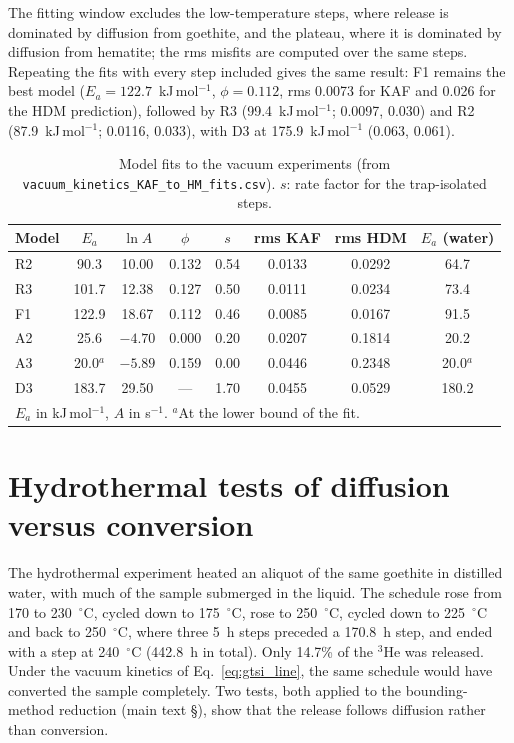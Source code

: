 The fitting window excludes the low-temperature steps, where release is dominated by diffusion from
goethite, and the plateau, where it is dominated by diffusion from hematite; the rms misfits are
computed over the same steps. Repeating the fits with every step included gives the same result:
F1 remains the best model ($E_a = 122.7$~kJ\,mol$^{-1}$, $\phi = 0.112$, rms 0.0073 for KAF and 0.026
for the HDM prediction), followed by R3 (99.4~kJ\,mol$^{-1}$; 0.0097, 0.030) and R2 (87.9~kJ\,mol$^{-1}$;
0.0116, 0.033), with D3 at 175.9~kJ\,mol$^{-1}$ (0.063, 0.061).

\begin{table}[htbp]
  \centering
  \caption{Model fits to the vacuum experiments (from \texttt{vacuum\_kinetics\_KAF\_to\_HM\_fits.csv}). $s$: rate factor for the trap-isolated steps.}
  \label{tab:gtsi_mech_fits}
  \begin{tabular}{lccccccc}
    \hline
    Model & $E_a$ & $\ln A$ & $\phi$ & $s$ & rms KAF & rms HDM & $E_a$ (water) \\
    \hline
    R2 & 90.3 & 10.00 & 0.132 & 0.54 & 0.0133 & 0.0292 & 64.7 \\
    R3 & 101.7 & 12.38 & 0.127 & 0.50 & 0.0111 & 0.0234 & 73.4 \\
    F1 & 122.9 & 18.67 & 0.112 & 0.46 & 0.0085 & 0.0167 & 91.5 \\
    A2 & 25.6 & $-4.70$ & 0.000 & 0.20 & 0.0207 & 0.1814 & 20.2 \\
    A3 & 20.0$^{a}$ & $-5.89$ & 0.159 & 0.00 & 0.0446 & 0.2348 & 20.0$^{a}$ \\
    D3 & 183.7 & 29.50 & --- & 1.70 & 0.0455 & 0.0529 & 180.2 \\
    \hline
    \multicolumn{8}{l}{\footnotesize $E_a$ in kJ\,mol$^{-1}$, $A$ in s$^{-1}$. $^{a}$At the lower bound of the fit.}
  \end{tabular}
\end{table}

\section{Hydrothermal tests of diffusion versus conversion}\label{sec:gtsi-hydro}

The hydrothermal experiment heated an aliquot of the same goethite in distilled water, with
much of the sample submerged in the liquid. The schedule rose from 170 to 230~$^\circ$C, cycled
down to 175~$^\circ$C, rose to 250~$^\circ$C, cycled down to 225~$^\circ$C and back to 250~$^\circ$C,
where three 5~h steps preceded a 170.8~h step, and ended with a step at 240~$^\circ$C (442.8~h in
total). Only 14.7\% of the $^3$He was released. Under the vacuum kinetics of
Eq.~\eqref{eq:gtsi_line}, the same schedule would have converted the sample completely. Two tests,
both applied to the bounding-method reduction (main text \S\MainRefBounding), show that the
release follows diffusion rather than conversion.

